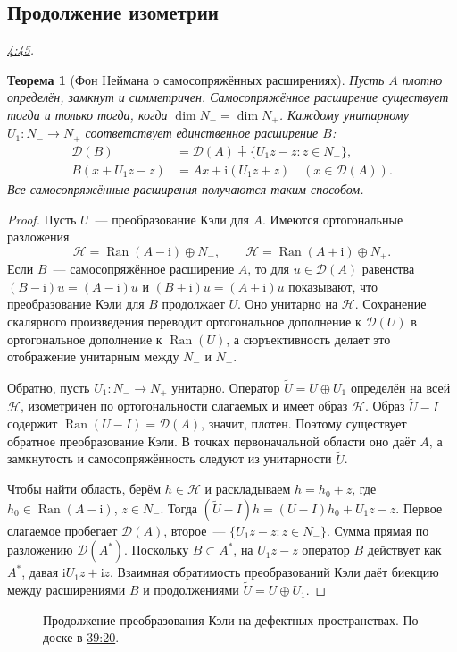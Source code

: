 \documentclass[11pt,a4paper]{article}
\theoremstyle{plain}
\newtheorem{theorem}{Теорема}[section]
\theoremstyle{definition}
\newcommand{\Hh}{\mathcal H}
\newcommand{\Dom}{\mathcal D}
\newcommand{\id}{I}
\newcommand{\ii}{\mathrm i}
\DeclareMathOperator{\Ran}{Ran}
\newcommand{\at}[3]{\href{https://www.youtube.com/watch?v=#1&t=#2s}{#3}}
\newcommand{\topic}[2]{\Needspace{5\baselineskip}\subsection*{#1}\noindent\emph{#2.}\par\nobreak\smallskip}
\begin{document}
\topic{Продолжение изометрии}{\at{Hsak3UepdSQ}{285}{4:45}}
\begin{theorem}[Фон Неймана о самосопряжённых расширениях]
Пусть $A$ плотно определён, замкнут и симметричен.
Самосопряжённое расширение существует тогда и только
тогда, когда $\dim N_-=\dim N_+$.
Каждому унитарному $U_1:N_-\to N_+$ соответствует
единственное расширение $B$:
\[
 \begin{aligned}
 \Dom(B)&=\Dom(A)\dotplus\{U_1z-z:z\in N_-\},\\
 B(x+U_1z-z)&=Ax+\ii(U_1z+z)\quad (x\in\Dom(A)).
 \end{aligned}
\]
Все самосопряжённые расширения получаются таким способом.
\end{theorem}
\begin{proof}
Пусть $U$~--- преобразование Кэли для $A$. Имеются
ортогональные разложения
\[
 \Hh=\Ran(A-\ii)\oplus N_-,\qquad
 \Hh=\Ran(A+\ii)\oplus N_+ .
\]
Если $B$~--- самосопряжённое расширение $A$, то для
$u\in\Dom(A)$ равенства $(B-\ii)u=(A-\ii)u$ и
$(B+\ii)u=(A+\ii)u$ показывают, что преобразование
Кэли для $B$ продолжает $U$. Оно унитарно на $\Hh$.
Сохранение скалярного произведения переводит
ортогональное дополнение к $\Dom(U)$ в ортогональное
дополнение к $\Ran(U)$, а сюръективность делает это
отображение унитарным между $N_-$ и $N_+$.

Обратно, пусть $U_1:N_-\to N_+$ унитарно.
Оператор $\widetilde U=U\oplus U_1$ определён на всей
$\Hh$, изометричен по ортогональности слагаемых и имеет
образ $\Hh$. Образ $\widetilde U-\id$ содержит
$\Ran(U-\id)=\Dom(A)$, значит, плотен. Поэтому
существует обратное преобразование Кэли. В точках
первоначальной области оно даёт $A$, а замкнутость
и самосопряжённость следуют из унитарности $\widetilde U$.

Чтобы найти область, берём $h\in\Hh$ и раскладываем
$h=h_0+z$, где $h_0\in\Ran(A-\ii)$, $z\in N_-$.
Тогда
$(\widetilde U-\id)h=(U-\id)h_0+U_1z-z$.
Первое слагаемое пробегает $\Dom(A)$, второе~---
$\{U_1z-z:z\in N_-\}$. Сумма прямая по разложению
$\Dom(A^*)$. Поскольку $B\subset A^*$, на $U_1z-z$
оператор $B$ действует как $A^*$, давая $\ii U_1z+\ii z$.
Взаимная обратимость преобразований Кэли даёт
биекцию между расширениями $B$ и продолжениями
$\widetilde U=U\oplus U_1$.
\end{proof}

\begin{figure}[ht]
\centering
{}
\caption{Продолжение преобразования Кэли на дефектных
пространствах. По доске в \at{Hsak3UepdSQ}{2360}{39:20}.}
\end{figure}
\end{document}
